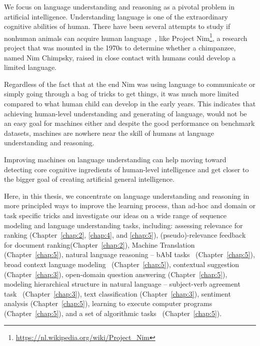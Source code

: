 We focus on language understanding and reasoning as a pivotal problem in artificial intelligence.  Understanding language is one of the extraordinary cognitive abilities of human. 
There have been several attempts to study if nonhuman animals can acquire human language~\citep{pepperberg2017animal}, like Project Nim\footnote{\url{https://nl.wikipedia.org/wiki/Project_Nim}}, a research project that was mounted in the 1970s to determine whether a chimpanzee, named Nim Chimpsky, raised in close contact with humans could develop a limited language. 

Regardless of the fact that at the end Nim was using language to communicate or simply going through a bag of tricks to get things, it was much more limited compared to what human child can develop in the early years. 
%
This indicates that achieving human-level understanding and generating of language, would not be an easy goal for machines either and despite the good performance on benchmark datasets, machines are nowhere near the skill of humans at language understanding and reasoning.

Improving machines on language understanding can help moving toward detecting core cognitive ingredients of human-level intelligence and get closer to the bigger goal of creating artificial general intelligence.

Here, in this thesis, we concentrate on language understanding and reasoning in more principled ways to improve the learning process, than ad-hoc and domain or task specific tricks and investigate our ideas on a wide range of sequence modeling and language understanding tasks, including:
% 
assessing relevance for ranking (Chapter~\ref{chap:2}, \ref{chap:4}, and \ref{chap:5}), 
%
(pseudo)-relevance feedback for document ranking(Chapter~\ref{chap:2}), 
%
Machine Translation (Chapter~\ref{chap:5}), 
%
natural language reasoning -- bAbI tasks~\citep{weston2015towards} (Chapter~\ref{chap:5}), 
%
broad context language modeling~\citep{paperno2016lambada} (Chapter~\ref{chap:5}), 
%
contextual suggestion~\citep{hashemioverview} (Chapter~\ref{chap:3}), 
%
open-domain question answering (Chapter~\ref{chap:5}), 
%
modeling hierarchical structure in natural language -- subject-verb agreement task~\citep{linzen2016assessing} (Chapter~\ref{chap:3}), 
%
text classification (Chapter~\ref{chap:3}), 
%
sentiment analysis (Chapter~\ref{chap:5}), 
%
learning to execute computer programs~\citep{ZS14} (Chapter~\ref{chap:5}), 
%
and a set of algorithmic tasks~\citep{neural_gpu} (Chapter~\ref{chap:5}).

